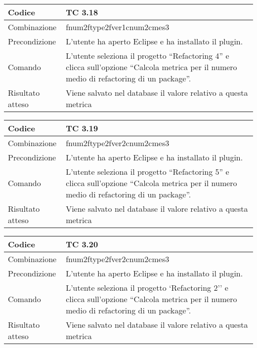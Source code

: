 \begin{table}[ht]
\begin{tabular}{|p{3cm}|p{9cm}|}
\hline
\cellcolor{lightgray}Codice				& TC 3.18								\\
\hline
\cellcolor{lightgray}Combinazione		& fnum2ftype2fver1cnum2cmes3  									\\
\hline
\cellcolor{lightgray}Precondizione		& L'utente ha aperto Eclipse e ha installato il plugin.				\\
\hline
\cellcolor{lightgray}Comando			& L'utente seleziona il progetto ``Refactoring 4''  e clicca sull'opzione ``Calcola metrica per il numero medio di refactoring di un package''.	\\
\hline
\cellcolor{lightgray}Risultato atteso	& Viene salvato nel database il valore relativo a questa metrica	\\
\hline
\end{tabular}
\end{table}

\begin{table}[ht]
\begin{tabular}{|p{3cm}|p{9cm}|}
\hline
\cellcolor{lightgray}Codice				& TC 3.19								\\
\hline
\cellcolor{lightgray}Combinazione		& fnum2ftype2fver2cnum2cmes3 									\\
\hline
\cellcolor{lightgray}Precondizione		& L'utente ha aperto Eclipse e ha installato il plugin.								\\
\hline
\cellcolor{lightgray}Comando			& L'utente seleziona il progetto ``Refactoring 5''  e clicca sull'opzione ``Calcola metrica per il numero medio di refactoring di un package''.	\\
\hline
\cellcolor{lightgray}Risultato atteso	& Viene salvato nel database il valore relativo a questa metrica	\\
\hline
\end{tabular}
\end{table}

\begin{table}[ht]
\begin{tabular}{|p{3cm}|p{9cm}|}
\hline
\cellcolor{lightgray}Codice				& TC 3.20								\\
\hline
\cellcolor{lightgray}Combinazione		& fnum2ftype2fver2cnum2cmes3 									\\
\hline
\cellcolor{lightgray}Precondizione		& L'utente ha aperto Eclipse e ha installato il plugin.									\\
\hline
\cellcolor{lightgray}Comando			& L'utente seleziona il progetto `Refactoring 2''  e clicca sull'opzione ``Calcola metrica per il numero medio di refactoring di un package''.	\\
\hline
\cellcolor{lightgray}Risultato atteso	& Viene salvato nel database il valore relativo a questa metrica	\\
\hline
\end{tabular}
\end{table}

